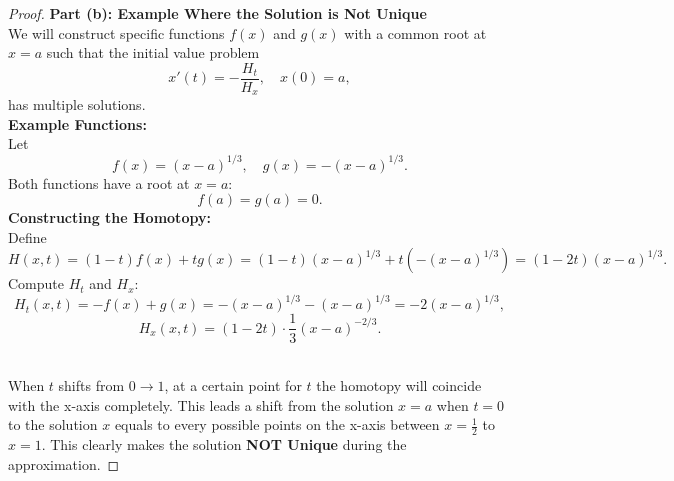 \documentclass{article}
\begin{document}
\begin{proof}
    \textbf{Part (b): Example Where the Solution is Not Unique}
    \\
    We will construct specific functions \( f(x) \) and \( g(x) \) with a common root at \( x = a \) such that the initial value problem
    \[
        x'(t) = -\frac{H_t}{H_x}, \quad x(0) = a,
    \]
    has multiple solutions.
    \\
    \textbf{Example Functions:}
    \\
    Let
    \[
        f(x) = (x - a)^{1/3}, \quad g(x) = -(x - a)^{1/3}.
    \]
    Both functions have a root at \( x = a \):
    \[
        f(a) = g(a) = 0.
    \]
    \textbf{Constructing the Homotopy:}
    \\
    Define
    \[
        H(x, t) = (1 - t) f(x) + t g(x) = (1 - t)(x - a)^{1/3} + t ( - (x - a)^{1/3} ) = (1 - 2t)(x - a)^{1/3}.
    \]
    Compute \( H_t \) and \( H_x \):
    \[
        H_t(x, t) = -f(x) + g(x) = - (x - a)^{1/3} - (x - a)^{1/3} = -2 (x - a)^{1/3},
    \]
    \[
        H_x(x, t) = (1 - 2t) \cdot \frac{1}{3} (x - a)^{-2/3}.
    \]

    \\
    When $t$ shifts from $0 \to 1$, at a certain point for $t$ the homotopy will coincide with the x-axis completely. 
    This leads a shift from the solution $x=a$ when $t=0$ to the solution $x$ equals to every possible points on the x-axis between $x = \frac{1}{2}$ to $x = 1$.
    This clearly makes the solution \textbf{NOT Unique} during the approximation.
\end{proof}
\end{document}
